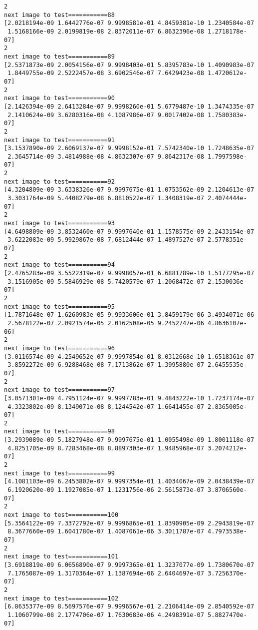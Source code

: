 \documentclass[11pt]{article}
\begin{document}
\begin{Verbatim}[commandchars=\\\{\}]
2
next image to test===========88
[2.0218194e-09 1.6442776e-07 9.9998581e-01 4.8459381e-10 1.2340584e-07
 1.5168166e-09 2.0199819e-08 2.8372011e-07 6.8632396e-08 1.2718178e-07]
2
next image to test===========89
[2.5371873e-09 2.0054156e-07 9.9998403e-01 5.8395783e-10 1.4090983e-07
 1.8449755e-09 2.5222457e-08 3.6902546e-07 7.6429423e-08 1.4720612e-07]
2
next image to test===========90
[2.1426394e-09 2.6413284e-07 9.9998260e-01 5.6779487e-10 1.3474335e-07
 2.1410624e-09 3.6280316e-08 4.1087986e-07 9.0017402e-08 1.7580383e-07]
2
next image to test===========91
[3.1537890e-09 2.6069137e-07 9.9998152e-01 7.5742340e-10 1.7248635e-07
 2.3645714e-09 3.4814988e-08 4.8632307e-07 9.8642317e-08 1.7997598e-07]
2
next image to test===========92
[4.3204809e-09 3.6338326e-07 9.9997675e-01 1.0753562e-09 2.1204613e-07
 3.3031764e-09 5.4408279e-08 6.8810522e-07 1.3408319e-07 2.4074444e-07]
2
next image to test===========93
[4.6498809e-09 3.8532460e-07 9.9997640e-01 1.1578575e-09 2.2433154e-07
 3.6222083e-09 5.9929867e-08 7.6812444e-07 1.4897527e-07 2.5778351e-07]
2
next image to test===========94
[2.4765283e-09 3.5522319e-07 9.9998057e-01 6.6881789e-10 1.5177295e-07
 3.1516905e-09 5.5846929e-08 5.7420579e-07 1.2068472e-07 2.1530036e-07]
2
next image to test===========95
[1.7871648e-07 1.6260983e-05 9.9933606e-01 3.8459179e-06 3.4934071e-06
 2.5678122e-07 2.0921574e-05 2.0162508e-05 9.2452747e-06 4.8636107e-06]
2
next image to test===========96
[3.0116574e-09 4.2549652e-07 9.9997854e-01 8.0312668e-10 1.6518361e-07
 3.8592272e-09 6.9288468e-08 7.1713862e-07 1.3995880e-07 2.6455535e-07]
2
next image to test===========97
[3.0571301e-09 4.7951124e-07 9.9997783e-01 9.4843222e-10 1.7237174e-07
 4.3323802e-09 8.1349071e-08 8.1244542e-07 1.6641455e-07 2.8365005e-07]
2
next image to test===========98
[3.2939089e-09 5.1827948e-07 9.9997675e-01 1.0055498e-09 1.8001118e-07
 4.8251705e-09 8.7283468e-08 8.8897303e-07 1.9485968e-07 3.2074212e-07]
2
next image to test===========99
[4.1081103e-09 6.2453802e-07 9.9997354e-01 1.4034067e-09 2.0438439e-07
 6.1920620e-09 1.1927085e-07 1.1231756e-06 2.5615873e-07 3.8706560e-07]
2
next image to test===========100
[5.3564122e-09 7.3372792e-07 9.9996865e-01 1.8390905e-09 2.2943819e-07
 8.3677660e-09 1.6041780e-07 1.4087061e-06 3.3011787e-07 4.7973538e-07]
2
next image to test===========101
[3.6918819e-09 6.0656890e-07 9.9997365e-01 1.3237077e-09 1.7380670e-07
 7.1765087e-09 1.3170364e-07 1.1387694e-06 2.6404697e-07 3.7256370e-07]
2
next image to test===========102
[6.8635377e-09 8.5697576e-07 9.9996567e-01 2.2106414e-09 2.8540592e-07
 1.1060799e-08 2.1774706e-07 1.7630683e-06 4.2498391e-07 5.8827470e-07]

\end{Verbatim}
\end{document}
